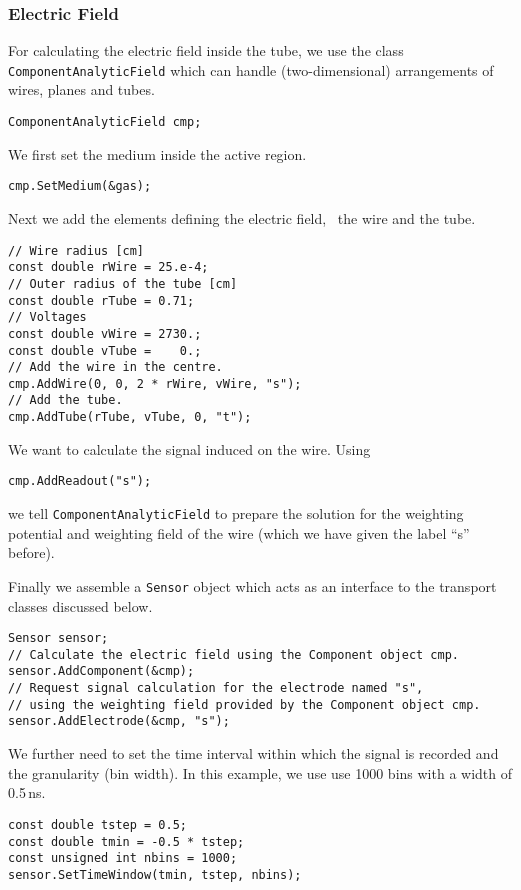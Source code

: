 \subsubsection{Electric Field}
For calculating the electric field inside the tube, 
we use the class \texttt{ComponentAnalyticField} which can handle 
(two-dimensional) arrangements of wires, planes and tubes.
\begin{lstlisting}
ComponentAnalyticField cmp;
\end{lstlisting}
We first set the medium inside the active region. 
\begin{lstlisting}
cmp.SetMedium(&gas); 
\end{lstlisting}
Next we add the elements defining the electric field, 
\ie~the wire and the tube.
\begin{lstlisting}
// Wire radius [cm]
const double rWire = 25.e-4;
// Outer radius of the tube [cm]
const double rTube = 0.71;
// Voltages
const double vWire = 2730.;
const double vTube =    0.;
// Add the wire in the centre.
cmp.AddWire(0, 0, 2 * rWire, vWire, "s");
// Add the tube.
cmp.AddTube(rTube, vTube, 0, "t");
\end{lstlisting}
We want to calculate the signal induced on the wire. 
Using 
\begin{lstlisting}
cmp.AddReadout("s");
\end{lstlisting}
we tell \texttt{ComponentAnalyticField} to prepare the solution for the 
weighting potential and weighting field of the wire 
(which we have given the label ``s'' before).
 
Finally we assemble a \texttt{Sensor} object which acts as an 
interface to the transport classes discussed below.
\begin{lstlisting}
Sensor sensor;
// Calculate the electric field using the Component object cmp.
sensor.AddComponent(&cmp);
// Request signal calculation for the electrode named "s", 
// using the weighting field provided by the Component object cmp.
sensor.AddElectrode(&cmp, "s"); 
\end{lstlisting}
We further need to set the time interval within which the
signal is recorded and the granularity (bin width). 
In this example, we use use 1000 bins with a width of 0.5\,ns.
\begin{lstlisting}
const double tstep = 0.5;
const double tmin = -0.5 * tstep;
const unsigned int nbins = 1000;
sensor.SetTimeWindow(tmin, tstep, nbins);
\end{lstlisting}

